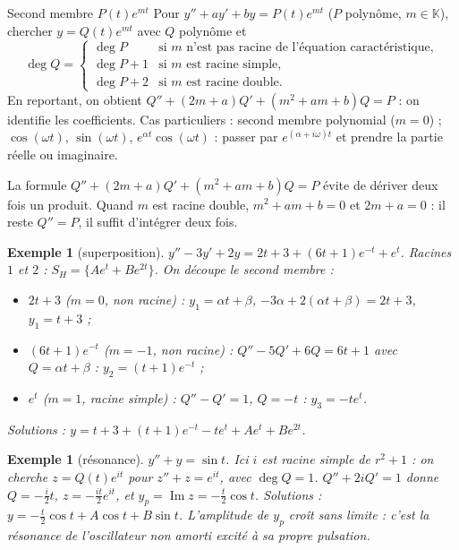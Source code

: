 \documentclass[a4paper,11pt]{article}
\numberwithin{equation}{section}
\numberwithin{figure}{section}
\numberwithin{table}{section}
\theoremstyle{enonce}
\theoremstyle{exemple}
\newtheorem{exemple}[definition]{Exemple}
\theoremstyle{remarque}
\newcommand{\K}{\mathbb{K}}
\begin{document}
\begin{methode}{Second membre $P(t)e^{mt}$}\label{m:part2}
Pour $y''+ay'+by=P(t)e^{mt}$ ($P$ polynôme, $m\in\K$), chercher $y=Q(t)e^{mt}$ avec $Q$ polynôme et
\[\deg Q=\begin{cases}\deg P&\text{si $m$ n'est pas racine de l'équation caractéristique},\\\deg P+1&\text{si $m$ est racine simple},\\\deg P+2&\text{si $m$ est racine double}.\end{cases}\]
En reportant, on obtient $Q''+(2m+a)Q'+(m^2+am+b)Q=P$ : on identifie les coefficients.
Cas particuliers : second membre polynomial ($m=0$) ; $\cos(\omega t)$, $\sin(\omega t)$, $e^{\alpha t}\cos(\omega t)$ : passer par
$e^{(\alpha+i\omega)t}$ et prendre la partie réelle ou imaginaire.
\end{methode}

\begin{astuce}
La formule $Q''+(2m+a)Q'+(m^2+am+b)Q=P$ évite de dériver deux fois un produit. Quand $m$ est racine double,
$m^2+am+b=0$ et $2m+a=0$ : il reste $Q''=P$, il suffit d'intégrer deux fois.
\end{astuce}

\begin{exemple}[superposition]
$y''-3y'+2y=2t+3+(6t+1)e^{-t}+e^t$. Racines $1$ et $2$ : $S_H=\{Ae^t+Be^{2t}\}$. On découpe le second membre :
\begin{itemize}
\item $2t+3$ ($m=0$, non racine) : $y_1=\alpha t+\beta$, $-3\alpha+2(\alpha t+\beta)=2t+3$, $y_1=t+3$ ;
\item $(6t+1)e^{-t}$ ($m=-1$, non racine) : $Q''-5Q'+6Q=6t+1$ avec $Q=\alpha t+\beta$ : $y_2=(t+1)e^{-t}$ ;
\item $e^t$ ($m=1$, racine simple) : $Q''-Q'=1$, $Q=-t$ : $y_3=-te^t$.
\end{itemize}
Solutions : $y=t+3+(t+1)e^{-t}-te^t+Ae^t+Be^{2t}$.
\end{exemple}

\begin{exemple}[résonance]
$y''+y=\sin t$. Ici $i$ est racine simple de $r^2+1$ : on cherche $z=Q(t)e^{it}$ pour $z''+z=e^{it}$, avec $\deg Q=1$.
$Q''+2iQ'=1$ donne $Q=-\frac{i}2t$, $z=-\frac{it}2e^{it}$, et $y_p=\operatorname{Im}z=-\frac t2\cos t$.
Solutions : $y=-\frac t2\cos t+A\cos t+B\sin t$. L'amplitude de $y_p$ croît sans limite : c'est la résonance de l'oscillateur
non amorti excité à sa propre pulsation.
\end{exemple}
\end{document}

